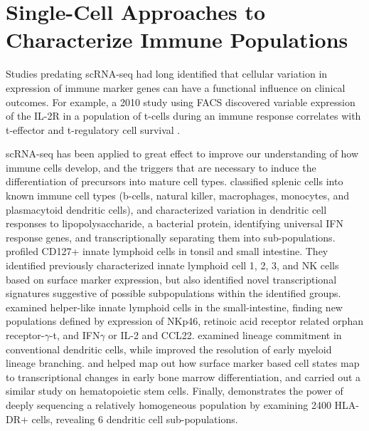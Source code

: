 \section{Single-Cell Approaches to Characterize Immune Populations}

Studies predating scRNA-seq had long identified that cellular variation in expression of immune marker genes can have a functional influence on clinical outcomes. 
For example, a 2010 study using FACS discovered variable expression of the IL-2R in a population of t-cells during an immune response correlates with t-effector and t-regulatory cell survival \citep{Feinerman2010}.

scRNA-seq has been applied to great effect to improve our understanding of how immune cells develop, and the triggers that are necessary to induce the differentiation of precursors into mature cell types. 
\cite{Jaitin2014} classified splenic cells into known immune cell types (b-cells, natural killer, macrophages, monocytes, and plasmacytoid dendritic cells), 
and characterized variation in dendritic cell responses to lipopolysaccharide, a bacterial protein, identifying universal IFN response genes, and transcriptionally separating them into sub-populations. 
\cite{Bjoerklund2016} profiled CD127+ innate lymphoid cells in tonsil and small intestine. 
They identified previously characterized innate lymphoid cell 1, 2, 3, and NK cells based on surface marker expression, but also identified novel transcriptional signatures suggestive of possible subpopulations within the identified groups.  
\cite{Gury-BenAri2016} examined helper-like innate lymphoid cells in the small-intestine, finding new populations defined by expression of NKp46, retinoic acid receptor related orphan receptor-$\gamma$-t, and IFN$\gamma$ or IL-2 and CCL22. 
\cite{Schlitzer2015} examined lineage commitment in conventional dendritic cells, while \cite{Drissen2016} improved the resolution of early myeloid lineage branching.
\cite{Loennberg2017} and \cite{Paul2015} helped map out how surface marker based cell states map to transcriptional changes in early bone marrow differentiation, and \cite{Nestorowa2016} carried out a similar study on hematopoietic stem cells.
Finally, \cite{Villani2017} demonstrates the power of deeply sequencing a relatively homogeneous population by examining 2400 HLA-DR+ cells, revealing 6 dendritic cell sub-populations.

